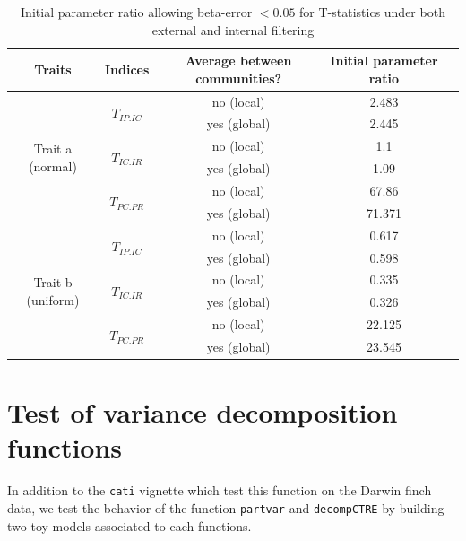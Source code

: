 \documentclass[12pt]{article}\usepackage[]{graphicx}\usepackage[]{color}
\begin{document}
\begin{table}[h!]
\begin{center}
\caption{Initial parameter ratio allowing beta-error $<0.05$ for T-statistics under both external and internal filtering}
\begin{tabular}{|c|c|c|c|m{6cm}|}
\hline
Traits & Indices & Average between communities? & Initial parameter ratio \tabularnewline
\hline \hline \hline
\multirow{6}{*}{Trait a (normal)} & \multirow{2}{*}{$T_{IP.IC}$} & no (local) & 2.483 \tabularnewline
\cline{3-4} 
 & & yes (global) & 2.445 \tabularnewline
\cline{2-4} 
 & \multirow{2}{*}{$T_{IC.IR}$} & no (local) & 1.1 \tabularnewline
\cline{3-4} 
 & & yes (global) & 1.09 \tabularnewline
\cline{2-4} 
 & \multirow{2}{*}{$T_{PC.PR}$} & no (local) & 67.86 \tabularnewline
\cline{3-4}
 & & yes (global)& 71.371 \tabularnewline

\hline \hline \hline

\multirow{6}{*}{Trait b (uniform)} & \multirow{2}{*}{$T_{IP.IC}$} & no (local) & 0.617 \tabularnewline
\cline{3-4}
 & & yes (global) &  0.598 \tabularnewline
\cline{2-4} 
 & \multirow{2}{*}{$T_{IC.IR}$} & no (local) & 0.335 \tabularnewline
\cline{3-4} 
 & & yes (global) &  0.326 \tabularnewline
\cline{2-4} 
 & \multirow{2}{*}{$T_{PC.PR}$} & no (local) & 22.125 \tabularnewline
\cline{3-4} 
 & & yes (global)&  23.545 \tabularnewline
\hline 
\end{tabular}
\end{center}
\end{table}























\cleardoublepage

\section{Test of variance decomposition functions}
 
In addition to the \texttt{cati} vignette which test this function on the Darwin finch data, we test the behavior of the function \texttt{partvar} and \texttt{decompCTRE} by building two toy models associated to each functions.
 
\end{document}
